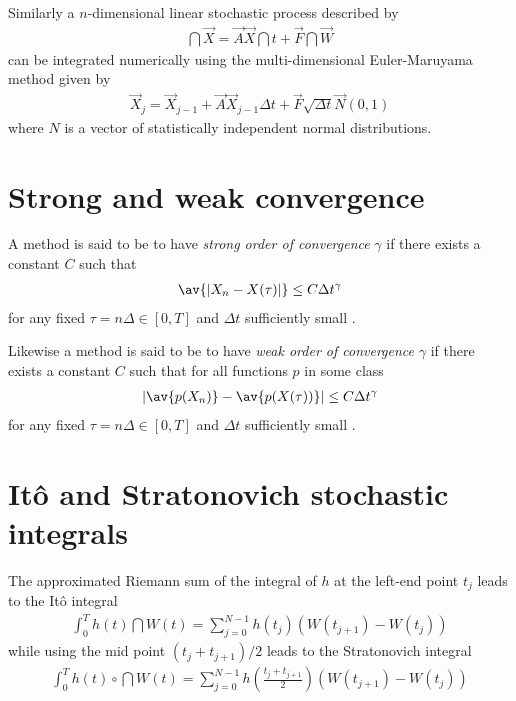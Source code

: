 \documentclass[10pt,a4paper]{article}
\begin{document}
Similarly a $n$-dimensional linear stochastic process described by
\begin{align}
\dint{\vec{X}} = \vec{A}\vec{X}\dint{t}+\vec{F}\dint{\vec{W}}
\end{align}
can be integrated numerically using the multi-dimensional Euler-Maruyama method given by
\begin{align}
\vec{X}_j = \vec{X}_{j{-}1}+\vec{A}\vec{X}_{j{-}1}\Delta t+\vec{F}\sqrt{\Delta t}\vec{N}(0,1)
\end{align}
where $N$ is a vector of statistically independent normal distributions.



\section{Strong and weak convergence}
A method is said to be to have \emph{strong order of convergence} $\gamma$ if there exists
a constant $C$ such that
\begin{align}
\av{|X_n-X(\tau)|} \leq C\Delta t^\gamma
\end{align}
for any fixed $\tau=n\Delta\in[0,T]$ and $\Delta t$ sufficiently small
\citep{higham:2001}.

Likewise a method is said to be to have \emph{weak order of convergence} $\gamma$ if there
exists a constant $C$ such that for all functions $p$ in some class
\begin{align}
|\av{p(X_n)}-\av{p(X(\tau))}| \leq C\Delta t^\gamma
\end{align}
for any fixed $\tau=n\Delta\in[0,T]$ and $\Delta t$ sufficiently small
\citep{higham:2001}.

\section{Itô and Stratonovich stochastic integrals}

The approximated Riemann sum of the integral of $h$ at the left-end point $t_j$ leads
to the Itô integral 
\begin{align}
\int_0^T h(t) \dint{W(t)} = \sum_{j=0}^{N-1} h\left(t_j\right)\left(W(t_{j+1})-W(t_j)\right)
\end{align}
while using the mid point $(t_j+t_{j+1})/2$ leads to the Stratonovich integral 
\begin{align}
\int_0^T h(t)\circ \dint{W(t)} = \sum_{j=0}^{N-1} h\left(\frac{t_j+t_{j+1}}{2}\right)
\left(W(t_{j+1})-W(t_j)\right)
\end{align}
\end{document}
